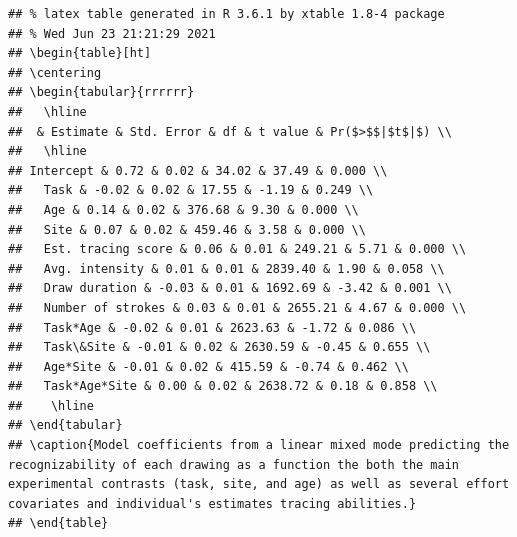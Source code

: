 \documentclass[
  english,
  man]{apa6}
\begin{document}
\begin{verbatim}
## % latex table generated in R 3.6.1 by xtable 1.8-4 package
## % Wed Jun 23 21:21:29 2021
## \begin{table}[ht]
## \centering
## \begin{tabular}{rrrrrr}
##   \hline
##  & Estimate & Std. Error & df & t value & Pr($>$$|$t$|$) \\ 
##   \hline
## Intercept & 0.72 & 0.02 & 34.02 & 37.49 & 0.000 \\ 
##   Task & -0.02 & 0.02 & 17.55 & -1.19 & 0.249 \\ 
##   Age & 0.14 & 0.02 & 376.68 & 9.30 & 0.000 \\ 
##   Site & 0.07 & 0.02 & 459.46 & 3.58 & 0.000 \\ 
##   Est. tracing score & 0.06 & 0.01 & 249.21 & 5.71 & 0.000 \\ 
##   Avg. intensity & 0.01 & 0.01 & 2839.40 & 1.90 & 0.058 \\ 
##   Draw duration & -0.03 & 0.01 & 1692.69 & -3.42 & 0.001 \\ 
##   Number of strokes & 0.03 & 0.01 & 2655.21 & 4.67 & 0.000 \\ 
##   Task*Age & -0.02 & 0.01 & 2623.63 & -1.72 & 0.086 \\ 
##   Task\&Site & -0.01 & 0.02 & 2630.59 & -0.45 & 0.655 \\ 
##   Age*Site & -0.01 & 0.02 & 415.59 & -0.74 & 0.462 \\ 
##   Task*Age*Site & 0.00 & 0.02 & 2638.72 & 0.18 & 0.858 \\ 
##    \hline
## \end{tabular}
## \caption{Model coefficients from a linear mixed mode predicting the recognizability of each drawing as a function the both the main experimental contrasts (task, site, and age) as well as several effort covariates and individual's estimates tracing abilities.} 
## \end{table}
\end{verbatim}
\end{document}
